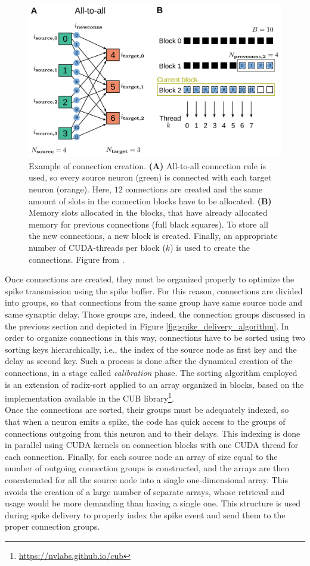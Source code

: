 \documentclass[a4paper, 12pt, twoside, openright]{book}
\begin{document}
\begin{figure}[H]
    \centering
    \includegraphics[width=0.85\columnwidth]{figures/conn_sketch.pdf}
    \caption{Example of connection creation. \textbf{(A)} All-to-all connection rule is used, so every source neuron (green) is connected with each target neuron (orange). Here, $12$ connections are created and the same amount of slots in the connection blocks have to be allocated.
    \textbf{(B)} Memory slots allocated in the blocks, that have already allocated memory for previous connections (full black squares). To store all the new connections, a new block is created. Finally, an appropriate number of CUDA-threads per block ($k$) is used to create the connections. Figure from \cite{Golosio2023}.}
    \label{fig:connection_creation}
\end{figure}

Once connections are created, they must be organized properly to optimize the spike transmission using the spike buffer. For this reason, connections are divided into groups, so that connections from the same group have same source node and same synaptic delay. Those groups are, indeed, the connection groups discussed in the previous section and depicted in Figure \ref{fig:spike_delivery_algorithm}. In order to organize connections in this way, connections have to be sorted using two sorting keys hierarchically, i.e., the index of the source node as first key and the delay as second key. Such a process is done after the dynamical creation of the connections, in a stage called \textit{calibration} phase. The sorting algorithm employed is an extension of radix-sort \cite{Cormen2009} applied to an array organized in blocks, based on the implementation available in the CUB library\footnote{\url{https://nvlabs.github.io/cub}}.\\
Once the connections are sorted, their groups must be adequately indexed, so that when a neuron emits a spike, the code has quick access to the groups of connections outgoing from this neuron and to their delays. This indexing is done in parallel using CUDA kernels on connection blocks with one CUDA thread for each connection. Finally, for each source node an array of size equal to the number of outgoing connection groups is constructed, and the arrays are then concatenated for all the source node into a single one-dimensional array. This avoids the creation of a large number of separate arrays, whose retrieval and usage would be more demanding than having a single one. This structure is used during spike delivery to properly index the spike event and send them to the proper connection groups.
\end{document}
